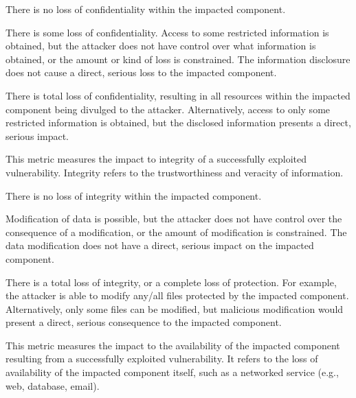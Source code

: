 \begin{description}[itemsep=1em,align=left]
\begin{description}[noitemsep,align=left]
                \item [None:] There is no loss of confidentiality within the impacted component.
                \item [Low:] There is some loss of confidentiality. 
                    Access to some restricted information is obtained, but the attacker does not have control over what information is obtained, or the amount or kind of loss is constrained. 
                    The information disclosure does not cause a direct, serious loss to the impacted component.
                \item [High:] There is total loss of confidentiality, resulting in all resources within the impacted component being divulged to the attacker. 
                    Alternatively, access to only some restricted information is obtained, but the disclosed information presents a direct, serious impact.
            \end{description}
        \item [Integrity:] This metric measures the impact to integrity of a successfully exploited vulnerability. 
            Integrity refers to the trustworthiness and veracity of information.
            \begin{description}[noitemsep,align=left]
                \item [None:] There is no loss of integrity within the impacted component.
                \item [Low:] Modification of data is possible, but the attacker does not have control over the consequence of a modification, or the amount of modification is constrained. 
                    The data modification does not have a direct, serious impact on the impacted component.
                \item [High:] There is a total loss of integrity, or a complete loss of protection. 
                    For example, the attacker is able to modify any/all files protected by the impacted component. 
                    Alternatively, only some files can be modified, but malicious modification would present a direct, serious consequence to the impacted component.
            \end{description}
        \item [Availability:] This metric measures the impact to the availability of the impacted component resulting from a successfully exploited vulnerability. 
            It refers to the loss of availability of the impacted component itself, such as a networked service (e.g., web, database, email). 

\end{description}
